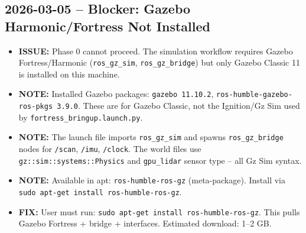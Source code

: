 \documentclass[11pt]{article}
\newcommand{\logentry}[1]{\subsection*{#1}}
\newcommand{\issue}[1]{\textcolor{issuered}{\textbf{ISSUE:} #1}}
\newcommand{\fix}[1]{\textcolor{fixgreen}{\textbf{FIX:} #1}}
\newcommand{\note}[1]{\textcolor{notblue}{\textbf{NOTE:} #1}}
\begin{document}
\logentry{2026-03-05 -- Blocker: Gazebo Harmonic/Fortress Not Installed}
\begin{itemize}
  \item \issue{Phase 0 cannot proceed. The simulation workflow requires Gazebo Fortress/Harmonic (\texttt{ros\_gz\_sim}, \texttt{ros\_gz\_bridge}) but only Gazebo Classic 11 is installed on this machine.}
  \item \note{Installed Gazebo packages: \texttt{gazebo 11.10.2}, \texttt{ros-humble-gazebo-ros-pkgs 3.9.0}. These are for Gazebo Classic, not the Ignition/Gz Sim used by \texttt{fortress\_bringup.launch.py}.}
  \item \note{The launch file imports \texttt{ros\_gz\_sim} and spawns \texttt{ros\_gz\_bridge} nodes for \texttt{/scan}, \texttt{/imu}, \texttt{/clock}. The world files use \texttt{gz::sim::systems::Physics} and \texttt{gpu\_lidar} sensor type -- all Gz Sim syntax.}
  \item \note{Available in apt: \texttt{ros-humble-ros-gz} (meta-package). Install via \texttt{sudo apt-get install ros-humble-ros-gz}.}
  \item \fix{User must run: \texttt{sudo apt-get install ros-humble-ros-gz}. This pulls Gazebo Fortress + bridge + interfaces. Estimated download: 1--2 GB.}
\end{itemize}
\end{document}
